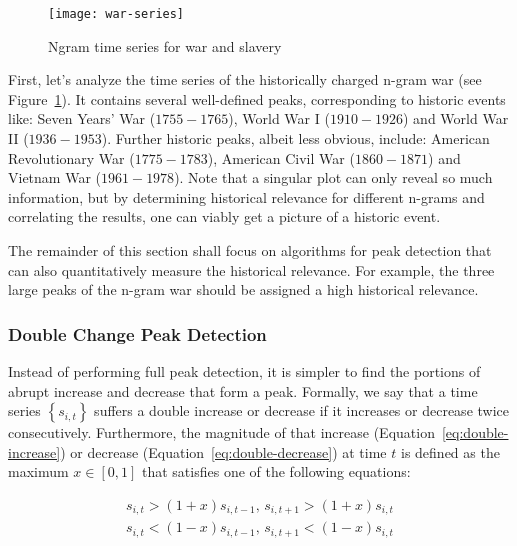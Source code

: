 
\begin{figure}[t]
\centering
\texttt{[image: war-series]}
\caption{Ngram time series for war and slavery}
\label{fig:war-series}
\end{figure}


First, let's analyze the time series of the historically charged n-gram war (see Figure~\ref{fig:war-series}). It contains several well-defined peaks, corresponding to historic events like: Seven Years' War ($1755 - 1765$), World War I ($1910 - 1926$) and World War II ($1936 - 1953$). Further historic peaks, albeit less obvious, include: American Revolutionary War ($1775 - 1783$), American Civil War ($1860 - 1871$) and Vietnam War ($1961 - 1978$). Note that a singular plot can only reveal so much information, but by determining historical relevance for different n-grams and correlating the results, one can viably get a picture of a historic event.

The remainder of this section shall focus on algorithms for peak detection that can also quantitatively measure the historical relevance. For example, the three large peaks of the n-gram war should be assigned a high historical relevance.

\subsubsection{Double Change Peak Detection}

Instead of performing full peak detection, it is simpler to find the portions of abrupt increase and decrease that form a peak. Formally, we say that a time series $\left\{ s_{i, t} \right\}$ suffers a double increase or decrease if it increases or decrease twice consecutively. Furthermore, the magnitude of that increase (Equation~\ref{eq:double-increase}) or decrease (Equation~\ref{eq:double-decrease}) at time $t$ is defined as the maximum $x \in \left[ 0, 1 \right]$ that satisfies one of the following equations:

\begin{align}
\label{eq:double-increase}
s_{i, t} > \left( 1 + x \right) s_{i, t - 1}, \, s_{i, t + 1} > \left( 1 + x \right) s_{i, t}
\\
\label{eq:double-decrease}
s_{i, t} < \left( 1 - x \right) s_{i, t - 1}, \, s_{i, t + 1} < \left( 1 - x \right) s_{i, t}
\end{align}


